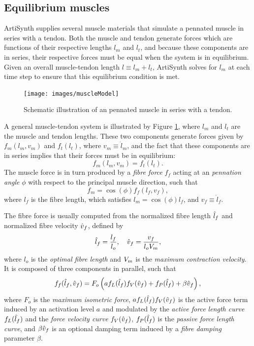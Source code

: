 \subsection{Equilibrium muscles}
\label{equilibriumMuscles:sec}

ArtiSynth supplies several muscle materials that simulate a pennated
muscle in series with a tendon. Both the muscle and tendon generate
forces which are functions of their respective lengths $l_m$ and
$l_t$, and because these components are in series, their respective
forces must be equal when the system is in equilibrium. Given an
overall muscle-tendon length $l \equiv l_m + l_t$, ArtiSynth solves
for $l_m$ at each time step to ensure that this equilibrium condition
is met.

\begin{figure}[h]
\begin{center}
 \texttt{[image: images/muscleModel]}
\end{center}
\caption{Schematic illustration of an pennated muscle in series with a
tendon.}
\label{equilibriumMuscles:fig}
\end{figure}

A general muscle-tendon system is illustrated by Figure
\ref{equilibriumMuscles:fig}, where $l_m$ and $l_t$ are the muscle and
tendon lengths.  These two components generate forces given by
$f_m(l_m, v_m)$ and $f_t(l_t)$, where $v_m \equiv \dot l_m$, and the
fact that these components are in series implies that their forces
must be in equilibrium:
%
\begin{equation}
f_m(l_m, v_m) = f_t(l_t).
\label{equilibrium:eqn}
\end{equation}
%
The muscle force is in turn produced by a {\it fibre force} $f_f$
acting at an {\it pennation angle} $\phi$ with respect to the
principal muscle direction, such that
%
\begin{equation*}
f_m = \cos(\phi) f_f (l_f, v_f),
\end{equation*}
%
where $l_f$ is the fibre length, which satisfies
$l_m = \cos(\phi) l_f$, and $v_f \equiv \dot l_f$.

The fibre force is usually computed from the normalized fibre length
$\hat{l}_f$ and normalized fibre velocity $\hat{v}_f$, defined by
%
\begin{equation}
\hat{l}_f = \frac{l_f}{l_o}, \quad \hat{v}_f = \frac{v_f}{l_o V_{m}},
\label{lfn:eqn}
\end{equation}
%
where $l_o$ is the {\it optimal fibre length} and $V_{m}$ is the {\it maximum
contraction velocity}. It is composed of three components in parallel,
such that
%
\begin{equation}
f_f (\hat{l}_f, \hat{v}_f) = F_o \left( a f_L(\hat{l}_f) f_V(\hat{v}_f) + f_P(\hat{l}_f) +
\beta \hat{v}_f \right),
\label{ff:eqn}
\end{equation}
%
where $F_o$ is the {\it maximum isometric force},
$a f_L(\hat{l}_f) f_V(\hat{v}_f)$ is the active force term induced by an
activation level $a$ and modulated by the {\it active force length
curve} $f_L(\hat{l}_f)$ and the {\it force velocity curve} $f_V(\hat{v}_f)$,
$f_P(\hat{l}_f)$ is the {\it passive force length curve}, and $\beta \hat{v}_f$
is an optional damping term induced by a {\it fibre damping} parameter
$\beta$.

